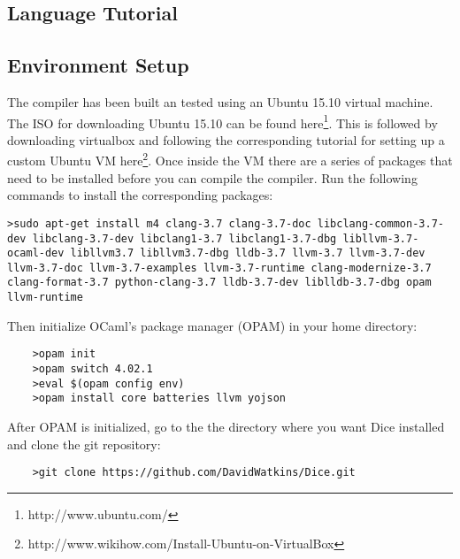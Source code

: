\begin{homeworkProblem}
	\chapter{Language Tutorial}
	\section{Environment Setup}
	The compiler has been built an tested using an Ubuntu 15.10 virtual machine. The ISO for downloading Ubuntu 15.10 can be found here\footnote{http://www.ubuntu.com/}. This is followed by downloading virtualbox and following the corresponding tutorial for setting up a custom Ubuntu VM here\footnote{http://www.wikihow.com/Install-Ubuntu-on-VirtualBox}. 
	Once inside the VM there are a series of packages that need to be installed before you can compile the compiler. Run the following commands to install the corresponding packages:
	\begin{verbatim}
>sudo apt-get install m4 clang-3.7 clang-3.7-doc libclang-common-3.7-dev libclang-3.7-dev libclang1-3.7 libclang1-3.7-dbg libllvm-3.7-ocaml-dev libllvm3.7 libllvm3.7-dbg lldb-3.7 llvm-3.7 llvm-3.7-dev llvm-3.7-doc llvm-3.7-examples llvm-3.7-runtime clang-modernize-3.7 clang-format-3.7 python-clang-3.7 lldb-3.7-dev liblldb-3.7-dbg opam llvm-runtime
	\end{verbatim}
	Then initialize OCaml's package manager (OPAM) in your home directory:
	\begin{verbatim}
	>opam init
	>opam switch 4.02.1
	>eval $(opam config env)
	>opam install core batteries llvm yojson
	\end{verbatim}
	After OPAM is initialized, go to the the directory where you want Dice installed and clone the git repository:
	\begin{verbatim}
	>git clone https://github.com/DavidWatkins/Dice.git
	\end{verbatim}

\end{homeworkProblem}
